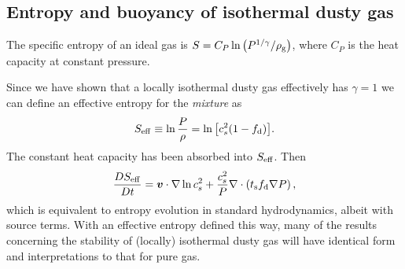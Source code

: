 


\subsection{Entropy and buoyancy of isothermal dusty gas }\label{dusty_entropy}

The specific entropy of an ideal gas is 
$S = C_P\ln{\left(P^{1/\gamma}/\rho_\mathrm{g}\right)}$, where $C_P$ is the heat 
capacity at constant pressure. 

Since we have shown that a locally isothermal dusty gas effectively
has $\gamma=1$ we can define an effective 
entropy for the \emph{mixture} as 
\begin{align}
   S_\mathrm{eff} \equiv \ln \frac{P}{\rho} = \ln{\left[c_s^2(1-f_\mathrm{d})\right]}.  
\end{align} 
The constant heat capacity has been absorbed into $S_\mathrm{eff}$. 
Then 
\begin{align*}
  \frac{D S_\mathrm{eff}}{D t} = \bm{v}\cdot\nabla\ln{c_s^2} +
  \frac{c_s^2}{P}\nabla\cdot\left(t_\mathrm{s}f_\mathrm{d}\nabla P\right), 
\end{align*}
which is equivalent to entropy evolution in standard  
hydrodynamics, albeit with source terms. With an effective
entropy defined this way, many of the  
results concerning the stability of (locally) isothermal dusty gas
will have identical form and interpretations to that for pure gas.   


